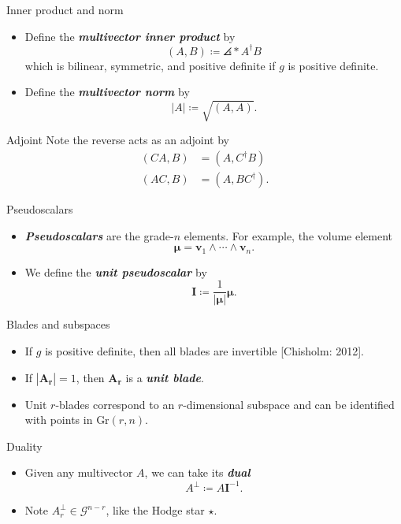 \documentclass[aspectratio=169,handout]{beamer}
\newcommand\boldgreen[1]{\textcolor{lighter_csu_green}{\emph{\textbf{#1}}}}
\newcommand{\G}{\mathcal{G}}
\newcommand{\Grassmannian}[2]{\textrm{Gr}(#1,#2)}
\newcommand{\blade}[1]{\boldsymbol{#1}}
\newcommand{\pseudoscalar}{\blade{I}}
\DeclarePairedDelimiter\angles{\langle}{\rangle}
\newcommand{\proj}[2]{\angles*{#2}_{#1}}
\begin{document}
\begin{frame}{Inner product and norm}
\vfill
\begin{itemize}
\pause
\item Define the \boldgreen{multivector inner product} by
\[
(A,B) \coloneqq \proj{}{A^\dagger B}
\]
which is bilinear, symmetric, and positive definite if $g$ is positive definite. 
\pause
\item Define the \boldgreen{multivector norm} by
\[
|A| \coloneqq \sqrt{(A,A)}.
\]
\end{itemize}
\vfill
\end{frame}

\begin{frame}{Adjoint}
\vfill
Note the reverse acts as an adjoint by
\begin{align}
(CA,B) &= (A,C^\dagger B)\\
(AC,B) &= (A,BC^\dagger).
\end{align}
\vfill
\end{frame}

\begin{frame}{Pseudoscalars}
\vfill
\begin{itemize}
\pause
\item \boldgreen{Pseudoscalars} are the grade-$n$ elements. For example, the volume element 
\[
\blade{\mu} = \blade{v}_1 \wedge \cdots \wedge \blade{v}_n.
\]
\pause  
\item We define the \boldgreen{unit pseudoscalar} by 
\[
\pseudoscalar \coloneqq \frac{1}{|\blade{\mu}|} \blade{\mu}.
\]
\end{itemize}
\vfill
\end{frame}

\begin{frame}{Blades and subspaces}
\vfill
\begin{itemize}
\pause
\item If $g$ is positive definite, then all blades are invertible [Chisholm: 2012].
\pause
\item If $|\blade{A_r}|=1$, then $\blade{A_r}$ is a \boldgreen{unit blade}. 
\pause
\item Unit $r$-blades correspond to an $r$-dimensional subspace and can be identified with points in $\Grassmannian{r}{n}$.
\end{itemize}
\vfill
\end{frame}

\begin{frame}{Duality}
\vfill
\begin{itemize}
\pause
\item Given any multivector $A$, we can take its \boldgreen{dual}
\[
A^\perp \coloneqq A \pseudoscalar^{-1}.
\]
\pause
\item Note $A_r^\perp \in \G^{n-r}$, like the Hodge star $\star$.
\end{itemize}
\vfill
\end{frame}
\end{document}
